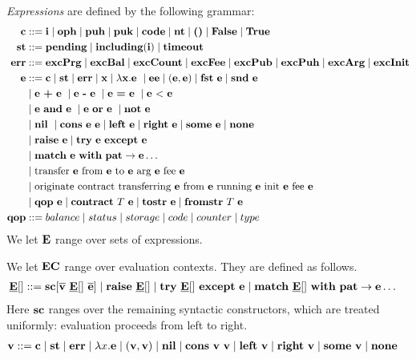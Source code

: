 \documentclass[a4paper]{llncs}
\begin{document}
\begin{definition}%
\emph{Expressions} are defined by the following grammar:
\begin{align*}
  \CONSTANT & ::= \INT %
              \mid \OPH \mid \PUH \mid\PUK \mid \CODE \mid
              \NTEZ \mid \SUNIT \mid \FALSE \mid \TRUE \\
  \STATUS & ::= \STATUSPENDING \mid \STATUSINCLUDING (\INT) \mid
            \STATUSTIMEOUT \\
  \ERROR &::= \ERRPRG \mid \ERRBAL \mid \ERRCOUNT \mid \ERRFEE \mid
           \ERRPUK \mid \ERRPUH \mid \ERRARG \mid \ERRINIT\\
	\EXPR & :: =  \CONSTANT \mid \STATUS \mid \ERROR \mid \VARIABLE \mid \lambda \VARIABLE. \EXPR\ 
	\mid \EXPR\EXPR \mid (\EXPR,\EXPR) \mid \FST\ \EXPR \mid \SND\ \EXPR 	%
	\\&\mid \EXPR\ \PLUS\ \EXPR\ \mid \EXPR\ \MINUS\ \EXPR\ \mid \EXPR\ \EQUAL\ \EXPR\ \mid \EXPR\ \LESS\ \EXPR
	\\&\mid \EXPR\ \AND\ \EXPR\ \mid \EXPR\ \OR\ \EXPR\ \mid \NOT\ \EXPR
  \\&\mid \NIL\ \mid \CONS\ \EXPR\ \EXPR \mid \LEFT\ \EXPR \mid\RIGHT\
  \EXPR \mid \SOME\ \EXPR \mid \NONE
  \\& \mid \RAISE\ \EXPR \mid \TRY\ \EXPR\ \EXCEPT\ \EXPR
  \\& \mid \MATCH\ \EXPR\ \WITH\ \PATTERN\to\EXPR \dots
  \\& \mid \TRANSFER[\EXPR]\EXPR\EXPR\EXPR\EXPR
  \\& \mid \ORIGINATE\EXPR\EXPR\EXPR\EXPR\EXPR
  \\&\mid \QOP\  \EXPR \mid \CONTRACT\ \TYPE\ \EXPR \mid \TOSTRING\
  \EXPR \mid \FROMSTRING\ \TYPE\ \EXPR\\
  \QOP & ::= balance \mid status \mid storage \mid code \mid counter \mid type
\end{align*}
We let $\textbf{E}$ range over sets of expressions.

We let $\textbf{EC}$ range over evaluation contexts. They are defined as
follows.
\begin{align*}
  \underline{\textbf{E}}[] & :: = \textbf{sc}[\overline{\textbf{v}}\ \underline{\textbf{E}}[]\ \overline{\textbf{e}}] \mid \textbf{raise}\ \underline{\textbf{E}}[] \mid \textbf{try}\ \underline{\textbf{E}}[]\ \textbf{except}\ \textbf{e}
  \mid \textbf{match}\ \underline{\textbf{E}}[]\ \textbf{with}\ \textbf{pat}\to\textbf{e} \dots
\end{align*}
Here $\textbf{sc}$ ranges over the remaining syntactic constructors, which are
treated uniformly: evaluation proceeds from left to right.
\begin{align*}
  \textbf{v} & ::= \textbf{c} \mid \textbf{st} \mid \textbf{err} \mid \lambda x.\textbf{e} \mid(\textbf{v}, \textbf{v}) \mid
         \textbf{nil} \mid \textbf{cons}\ \textbf{v}\ \textbf{v} \mid \textbf{left}\ \textbf{v} \mid \textbf{right}\
         \textbf{v} \mid \textbf{some}\ \textbf{v}\mid \textbf{none}
\end{align*}
\end{definition}
\end{document}
